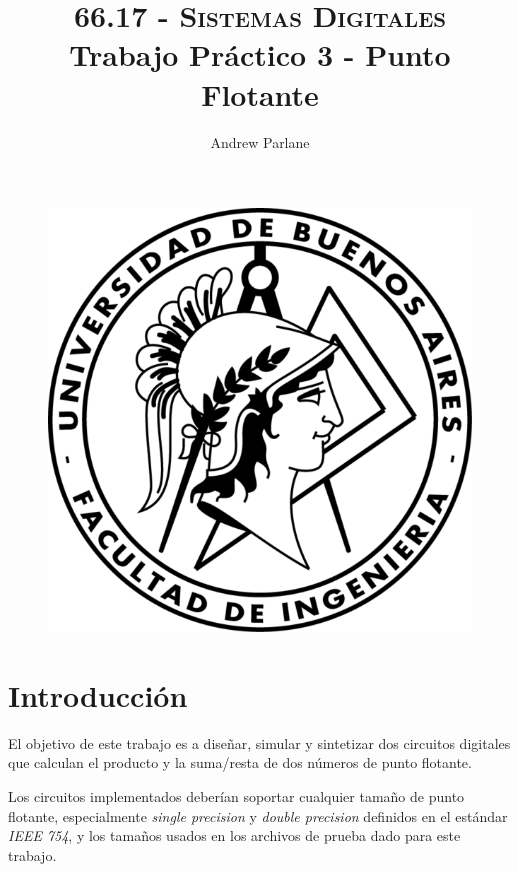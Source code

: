 \documentclass[a4paper]{article}
\begin{document}
\begin{figure}
\centering
\includegraphics[scale=1]{./img/logo-facu}
\end{figure}

\title{\large\textsc{66.17 - Sistemas Digitales}\\
\large Trabajo Práctico 3 - Punto Flotante}

\author{
Andrew Parlane \\
}

\maketitle

\newpage

\tableofcontents

\newpage

\section{Introducción}

El objetivo de este trabajo es a diseñar, simular y sintetizar dos circuitos digitales que calculan el producto y la suma/resta de dos números de punto flotante.

Los circuitos implementados deberían soportar cualquier tamaño de punto flotante, especialmente \textit{single precision} y \textit{double precision} definidos en el estándar \textit{IEEE 754}, y los tamaños usados en los archivos de prueba dado para este trabajo.
\end{document}
